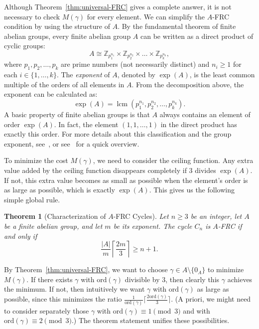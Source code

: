 \documentclass[a4paper,12pt]{article}
\theoremstyle{plain}
\newtheorem{theorem}{Theorem}[section]
\theoremstyle{definition}
\renewcommand\ge\geqslant
\newcommand\ord{\textrm{ord}}
\begin{document}
Although Theorem~\ref{thm:universal-FRC} gives a complete answer, it is not necessary to check $M(\gamma)$ for every element. We can simplify the $A$-FRC condition by using the structure of $A$. By the fundamental theorem of finite abelian groups, every finite abelian group $A$ can be written as a direct product of cyclic groups:
\[ A \cong \mathbb{Z}_{p_1^{n_1}} \times \mathbb{Z}_{p_2^{n_2}} \times \dots \times \mathbb{Z}_{p_k^{n_k}}, \]
where $p_1, p_2, \dots, p_k$ are prime numbers (not necessarily distinct) and $n_i \ge 1$ for each $i \in \{1, \dots, k\}$. 
The \emph{exponent} of $A$, denoted by $\exp(A)$, is the least common multiple of the orders of all elements in $A$. From the decomposition above, the exponent can be calculated as:
\[ \exp(A) = \operatorname{lcm}(p_1^{n_1}, p_2^{n_2}, \dots, p_k^{n_k}). \]
A basic property of finite abelian groups is that $A$ always contains an element of order $\exp(A)$. In fact, the element $(1, 1, \dots, 1)$ in the direct product has exactly this order. For more details about this classification and the group exponent, see~\cite[Section 5.2, Theorem 5]{dummit2004abstract}, or see~\cite{wiki:abelian_group_classification, enwiki:1350147197} for a quick overview.

To minimize the cost $M(\gamma)$, we need to consider the ceiling function. Any extra value added by the ceiling function disappears completely if $3$ divides $\exp(A)$. If not, this extra value becomes as small as possible when the element's order is as large as possible, which is exactly $\exp(A)$. This gives us the following simple global rule.

\begin{theorem}[Characterization of $A$-FRC Cycles]\label{thm:cycle-FRC-exponent-threshold}
Let $n \ge 3$ be an integer, let $A$ be a finite abelian group,
and let $m$ be its exponent. The cycle $C_n$ is $A$-FRC if and only if 
\[ \frac{|A|}{m} \left\lceil \frac{2m}{3} \right\rceil \ge n + 1. \]
\end{theorem}
By Theorem~\ref{thm:universal-FRC}, we want to choose $\gamma\in A\setminus\{0_A\}$ to minimize $M(\gamma)$.  If there exists $\gamma$ with $\ord(\gamma)$ divisible by $3$, then clearly this $\gamma$ achieves the minimum.  If not, then intuitively we want $\gamma$ with $\ord(\gamma)$ as large as possible, since this minimizes the ratio $\frac{1}{\ord(\gamma)}\lceil\frac{2\ord(\gamma)}3\rceil$.  (A priori, we might need to consider separately those $\gamma$ with $\ord(\gamma)\equiv 1\pmod 3$
and with $\ord(\gamma)\equiv 2\pmod 3$.)  The theorem statement unifies these possibilities.
\end{document}

